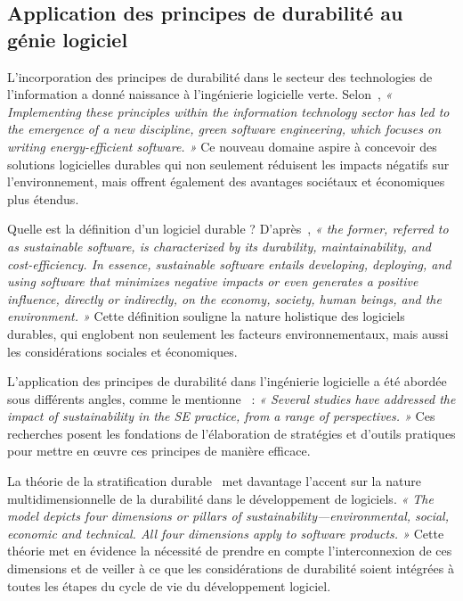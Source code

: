 
\subsection{Application des principes de durabilité au génie logiciel}
L'incorporation des principes de durabilité dans le secteur des technologies de l'information a donné naissance à l'ingénierie logicielle verte. Selon~\cite{IntegrationSustainabilityMetrics}, \emph{« Implementing these principles within the information technology sector has led to the emergence of a new discipline, green software engineering, which focuses on writing energy-efficient software. »} Ce nouveau domaine aspire à concevoir des solutions logicielles durables qui non seulement réduisent les impacts négatifs sur l'environnement, mais offrent également des avantages sociétaux et économiques plus étendus.


Quelle est la définition d'un logiciel durable ? D'après~\cite{IntegrationSustainabilityMetrics}, \emph{« the former, referred to as sustainable software, is characterized by its durability, maintainability, and cost-efficiency. In essence, sustainable software entails developing, deploying, and using software that minimizes negative impacts or even generates a positive influence, directly or indirectly, on the economy, society, human beings, and the environment. »} Cette définition souligne la nature holistique des logiciels durables, qui englobent non seulement les facteurs environnementaux, mais aussi les considérations sociales et économiques.


L'application des principes de durabilité dans l'ingénierie logicielle a été abordée sous différents angles, comme le mentionne~\cite{GreenSustainableEngMapping} : \emph{« Several studies have addressed the impact of sustainability in the SE practice, from a range of perspectives. »} Ces recherches posent les fondations de l'élaboration de stratégies et d'outils pratiques pour mettre en œuvre ces principes de manière efficace.


La théorie de la stratification durable~\cite{SustainableStratifiedTheory} met davantage l'accent sur la nature multidimensionnelle de la durabilité dans le développement de logiciels. \emph{« The model depicts four dimensions or pillars of sustainability—environmental, social, economic and technical. All four dimensions apply to software products. »} Cette théorie met en évidence la nécessité de prendre en compte l'interconnexion de ces dimensions et de veiller à ce que les considérations de durabilité soient intégrées à toutes les étapes du cycle de vie du développement logiciel.


